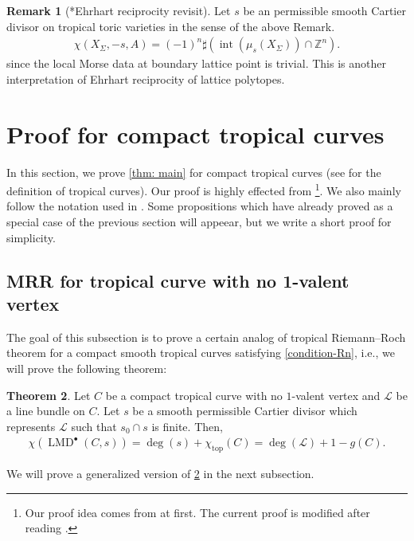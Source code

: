 \documentclass[a4paper,dvipdfmx,reqno,12pt]{amsart}
\theoremstyle{definition}
\newtheorem{theorem}{Theorem}[section]
\newtheorem{remark}[theorem]{Remark}
\newcommand{\Z}{\mathbb{Z}}%
\newcommand{\opn}[1]{\operatorname{#1}}
\numberwithin{equation}{section}
\begin{document}
\begin{remark}[{*Ehrhart reciprocity revisit}]
Let $s$ be an permissible smooth Cartier divisor on 
tropical toric varieties in the sense of the above Remark.
\begin{align}
\chi(X_{\Sigma},-s,A)=(-1)^{n}\sharp 
(\opn{int}(\mu_s(X_{\Sigma}))\cap \Z^{n}).
\end{align} since
the local Morse data at boundary lattice point is trivial.
This is another interpretation of Ehrhart reciprocity of 
lattice polytopes.
\end{remark}



\iffalse
From definition,
\begin{align}
df(x)\notin \opn{lineal}(S,x)^{\bot} 
\Rightleftarrows df|_{\opn{lineal}(S,x)}(x)\ne 0
\end{align}

Fix a polyhedral fan structure $\mathscr{P}$ of 
$S/\opn{lineal}(S,x)$. The pullback induced from
$\opn{pr}\colon S\to S/\opn{lineal}(S,x)$ induces 
a fan structure on
$\bigcup_{x\in sigma \in \mathscr{P}}\sigma=
\opn{lineal}(S,x)$.

\fi





\section{Proof for compact tropical curves}
In this section, we prove \cref{thm: main} for 
compact tropical curves
(see \cite[Definition 3.1]{mikhalkinTropicalCurvesTheir2008a} 
for the definition of tropical curves).
Our proof is highly effected from 
\cite{knill2012graph,MR2676658,auroux2022lagrangian}
\footnote{Our proof idea comes from 
\cite{knill2012graph,MR2676658} at first.  
The current proof is modified after reading 
\cite{auroux2022lagrangian}.}.
We also mainly follow the notation used in 
\cite{auroux2022lagrangian}.
Some propositions which have already proved as a special case
of the previous section will appeear, but we write a short proof 
for simplicity.

\subsection{MRR for tropical curve with no 1-valent
vertex}

The goal of this subsection is to prove a certain 
analog of tropical Riemann--Roch theorem for
a compact smooth tropical 
curves satisfying \cref{condition-Rn}, i.e., 
we will prove
the following theorem:
\begin{theorem}
\label{theorem-MRR-metric-graph}
Let $C$ be a compact tropical curve with 
no $1$-valent vertex and 
$\mathcal{L}$ be a line bundle on $C$.
Let $s$ be a smooth permissible Cartier divisor which
represents $\mathcal{L}$ such that 
$s_0\cap s$ is finite. Then,
\begin{align}
  \chi(\opn{LMD}^{\bullet}(C,s))=\opn{deg}(s)+
\chi_{\opn{top}}(C)=\opn{deg}(\mathcal{L})+1-g(C).
\end{align}
\end{theorem}
We will prove a generalized version of 
\cref{theorem-MRR-metric-graph} in the next subsection.
\end{document}

